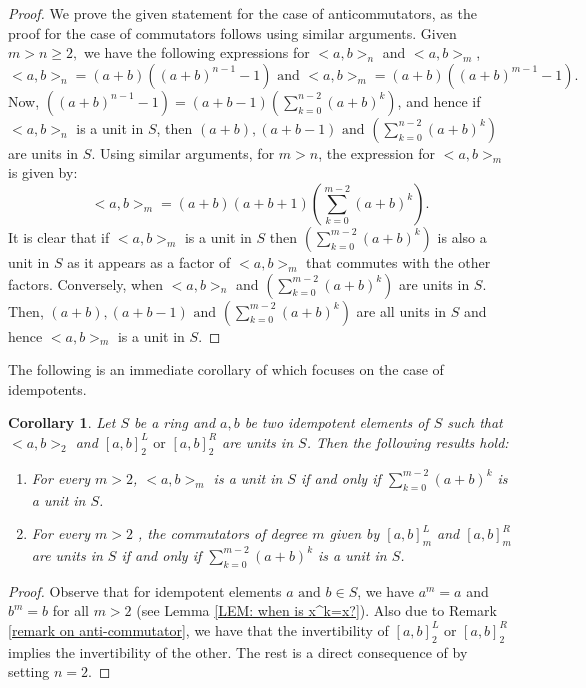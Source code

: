 \documentclass[12pt]{amsart}
\newtheorem{cor}[theorem]{Corollary}
\theoremstyle{definition}
\numberwithin{equation}{section}
\begin{document}
\begin{proof}
We prove the given statement for the case of anticommutators, as the proof for the case of commutators follows using similar arguments. Given $m>n \geq 2,$ we have the following expressions for $<a,b>_n$ and $<a,b>_m$,
$$<a,b>_n=(a+b)((a+b)^{n-1}-1) \text{ and }<a,b>_m=(a+b)((a+b)^{m-1}-1).$$
Now, $((a+b)^{n-1}-1)=(a+b-1)\left(\displaystyle\sum_{k=0}^{n-2}(a+b)^k\right)$, and hence if $<a,b>_n$ is a unit in $S$, then $(a+b),(a+b-1) \text{ and }\left(\displaystyle\sum_{k=0}^{n-2}(a+b)^k\right)$ are units in $S$. Using similar arguments, for $m>n$, the expression for $<a,b>_m$ is given by:
$$<a,b>_m=(a+b)(a+b+1)\left(\displaystyle\sum_{k=0}^{m-2}(a+b)^k\right).$$
It is clear that if $<a,b>_m$ is a unit in $S$ then $\left(\displaystyle\sum_{k=0}^{m-2}(a+b)^k\right)$ is also a unit in $S$ as it appears as a factor of $<a,b>_m$ that commutes with the other factors. Conversely, when $<a,b>_n$ and  $\left(\displaystyle\sum_{k=0}^{m-2}(a+b)^k\right)$ are units in $S$. Then, $(a+b), (a+b-1) \text{ and }\left(\displaystyle\sum_{k=0}^{m-2}(a+b)^k\right)$ are all units in $S$ and hence $<a,b>_m$ is a unit in $S$. 
\end{proof}
The following is an immediate corollary of  which focuses on the case of idempotents. 
\begin{cor}\label{COR: Higher vs Lower for Idempotents}
   Let $S$ be a ring and $a,b$ be two idempotent elements of $S$ such that $<a,b>_2$ and $[a,b]^L_2 \text{ or } [a,b]_2^R$ are units in $S$. Then the following results hold:
    \begin{enumerate}
        \item For every $m >2$, $<a,b>_m$ is a unit in $S$ if and only if $\displaystyle\sum_{k=0}^{m-2}(a+b)^k$ is a unit in $S$.
        \item For every $m >2$ , the commutators of degree $m$ given by $[a,b]_m^L$ and $[a,b]_m^R$ are units in $S$ if and only if $\displaystyle\sum_{k=0}^{m-2}(a+b)^k$ is a unit in $S$. 
    \end{enumerate}   
\end{cor}
\begin{proof}
Observe that for idempotent elements $a \text{ and }b \in S$, we have $a^m=a$ and $b^m=b$ for all $m>2$ (see Lemma \ref{LEM: when is x^k=x?}). Also due to Remark \ref{remark on anti-commutator}, we have that the invertibility of $[a,b]^L_2 \text{ or } [a,b]_2^R$ implies the invertibility of the other. The rest is a direct consequence of  by setting $n=2$. 
\end{proof}
\end{document}
